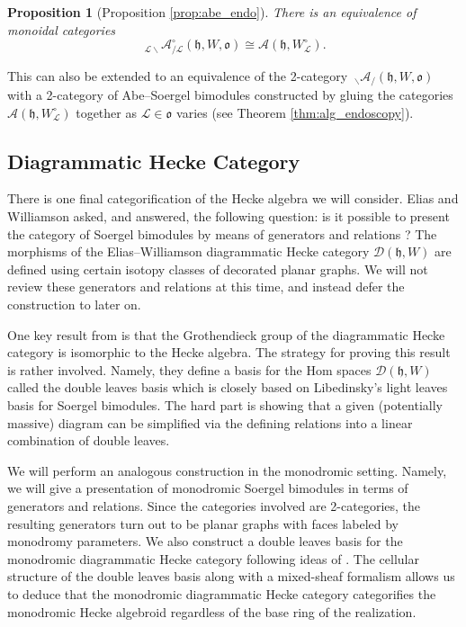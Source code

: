 \documentclass{amsart}
\newcommand{\scrA}{\mathcal{A}}
\newcommand{\scrL}{\mathcal{L}}
\newcommand{\fr}[1]{\mathfrak{#1}}
\newcommand{\EW}{\mathcal{D}}
\newcommand{\Amon}[2]{\:_{#1 \backslash} \mathcal{A}_{/ #2} }
\newtheorem{proposition}[subsubsection]{Proposition}
\theoremstyle{definition}
\numberwithin{equation}{subsection}
\begin{document}
\begin{proposition}[Proposition \ref{prop:abe_endo}]
    There is an equivalence of monoidal categories
    \[\Amon{\scrL}{\scrL}^{\circ} (\fr{h}, W, \fr{o}) \cong \scrA (\fr{h}, W_{\scrL}^{\circ}).\]
\end{proposition}

This can also be extended to an equivalence of the 2-category $\Amon{}{} (\fr{h}, W, \fr{o})$ with a 2-category of Abe--Soergel bimodules constructed by gluing the categories $\scrA (\fr{h}, W_{\scrL}^{\circ})$ together as $\scrL \in \fr{o}$ varies (see Theorem \ref{thm:alg_endoscopy}).

\subsection{Diagrammatic Hecke Category}

There is one final categorification of the Hecke algebra we will consider. Elias and Williamson asked, and answered, the following question: is it possible to present the category of Soergel bimodules by means of generators and relations \cite{EW}?
The morphisms of the Elias--Williamson diagrammatic Hecke category $\EW (\fr{h}, W)$ are defined using certain isotopy classes of decorated planar graphs.
We will not review these generators and relations at this time, and instead defer the construction to later on.

One key result from \cite{EW} is that the Grothendieck group of the diagrammatic Hecke category is isomorphic to the Hecke algebra.
The strategy for proving this result is rather involved. Namely, they define a basis for the Hom spaces $\EW (\fr{h}, W)$ called the double leaves basis which is closely based on Libedinsky's light leaves basis \cite{Lib08} for Soergel bimodules.
The hard part is showing that a given (potentially massive) diagram can be simplified via the defining relations into a linear combination of double leaves.

We will perform an analogous construction in the monodromic setting. Namely, we will give a presentation of monodromic Soergel bimodules in terms of generators and relations.
Since the categories involved are 2-categories, the resulting generators turn out to be planar graphs with faces labeled by monodromy parameters.
We also construct a double leaves basis for the monodromic diagrammatic Hecke category following ideas of \cite{EW}. 
The cellular structure of the double leaves basis along with a mixed-sheaf formalism allows us to deduce that the monodromic diagrammatic Hecke category categorifies the monodromic Hecke algebroid regardless of the base ring of the realization.
\end{document}
